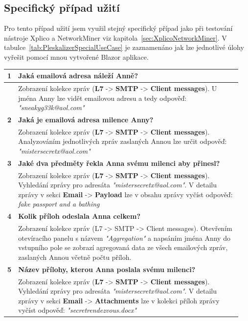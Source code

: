     
        \subsection{Specifický případ užití}
        Pro tento případ užití jsem využil stejný specifický případ jako při testování nástroje Xplico a NetworkMiner viz kapitola~\ref{sec:XplicoNetworkMiner}. V tabulce~\ref{tab:PleskalizerSpecialUseCase} je zaznamenáno jak lze jednotlivé úlohy vyřešit pomocí mnou vytvořené Blazor aplikace.
\begin{center}
\begin{table}[ht]
    \centering
    \def\arraystretch{1.5}
    \begin{tabular}{| p{0.02\linewidth} | p{0.93\linewidth} |}
    \hline
        \textbf{1}   & \textbf{Jaká emailová adresa náleží Anně?} \\ \hline
            & Zobrazení kolekce zpráv (\textbf{L7} -> \textbf{SMTP} -> \textbf{Client messages}). U jména Anny lze vidět emailovou adresu a tedy odpověď: \textit{"sneakyg33k@aol.com"} \\ \hline
            
        \textbf{2}   & \textbf{Jaká je emailová adresa milence Anny?} \\ \hline
            & Zobrazení kolekce zpráv (\textbf{L7} -> \textbf{SMTP} -> \textbf{Client messages}). Analyzováním jednotlivých zpráv zaslaných Annou lze určit odpověď: \textit{"mistersecretx@aol.com"} \\ \hline

        \textbf{3}   & \textbf{Jaké dva předměty řekla Anna svému milenci aby přinesl?} \\ \hline
            & Zobrazení kolekce zpráv (\textbf{L7} -> \textbf{SMTP} -> \textbf{Client messages}). Vyhledání zprávy pro adresáta \textit{"mistersecretx@aol.com"}. V detailu zprávy v sekci \textbf{Email} -> \textbf{Payload} lze v obsahu zprávy vyčíst odpověď: \textit{fake passport and a bathing}  \\ \hline

        \textbf{4}   & \textbf{Kolik příloh odeslala Anna celkem?} \\ \hline
            & Zobrazení kolekce zpráv (L7 -> SMTP -> Client messages). Otevřením otevíracího panelu s názvem \textit{"Aggregation"} a napsáním jména Anny do vstupního pole se zobrazí agregovaná data ze všech emailových zpráv, zaslaných Annou včetně počtu příloh. \\ \hline

        \textbf{5}   & \textbf{Název přílohy, kterou Anna poslala svému milenci?} \\ \hline
            & Zobrazení kolekce zpráv (\textbf{L7} -> \textbf{SMTP} -> \textbf{Client messages}). Vyhledání zprávy pro adresáta \textit{"mistersecretx@aol.com"}. V detailu zprávy v sekci \textbf{Email} -> \textbf{Attachments} lze v kolekci příloh zprávy vyčíst odpověď: \textit{"secretrendezvous.docx"} \\ \hline


\end{tabular}
\end{table}
\end{center}
